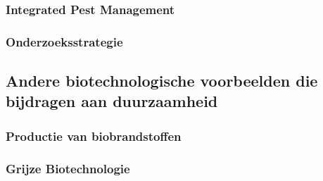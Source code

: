 \documentclass[a4paper,kul]{kulakarticle} %
\begin{document}
\subsubsection{Integrated Pest Management}
\subsubsection{Onderzoeksstrategie}
\subsection{Andere biotechnologische voorbeelden die bijdragen aan duurzaamheid}
\subsubsection{Productie van biobrandstoffen}
\subsubsection{Grijze Biotechnologie}
\end{document}
